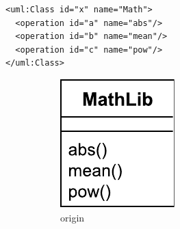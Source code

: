 \documentclass{llncs}
\begin{document}
\vspace{-20pt}
\begin{minipage}[t]{0.59\linewidth} 
\centering
\begin{lstlisting}[style=eol,caption={The simplified XMI of the model in Fig. \ref{fig:origin}.},label=lst:originxmi]
<uml:Class id="x" name="Math">
  <operation id="a" name="abs"/>
  <operation id="b" name="mean"/>
  <operation id="c" name="pow"/>
</uml:Class>
\end{lstlisting}
\vspace{-25pt}
\begin{figure}[H]
\centering    
\hfill
\begin{subfigure}[t]{0.2\linewidth}
    \centering
    \includegraphics[width=\linewidth]{images/OriginalClassDiagram}
    \caption{origin}
    \label{fig:origin}
\end{subfigure}
\hfill
\begin{subfigure}[t]{0.2\linewidth}
    \centering

\end{subfigure}
\end{figure}
\end{minipage}
\end{document}
